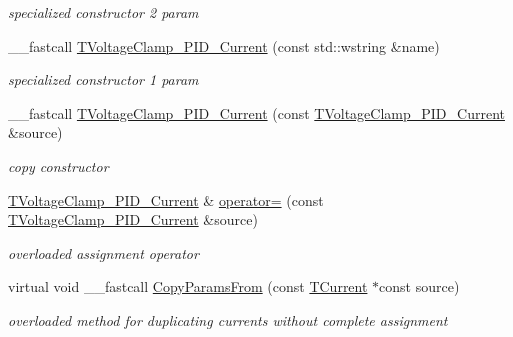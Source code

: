 \begin{DoxyCompactItemize}
\begin{DoxyCompactList}\small\item\em specialized constructor 2 param \end{DoxyCompactList}\item 
\hypertarget{class_t_voltage_clamp___p_i_d___current_a25b4322894753f9ca41a5fd465ece8e1}{\+\_\+\+\_\+fastcall \hyperlink{class_t_voltage_clamp___p_i_d___current_a25b4322894753f9ca41a5fd465ece8e1}{T\+Voltage\+Clamp\+\_\+\+P\+I\+D\+\_\+\+Current} (const std\+::wstring \&name)}\label{class_t_voltage_clamp___p_i_d___current_a25b4322894753f9ca41a5fd465ece8e1}

\begin{DoxyCompactList}\small\item\em specialized constructor 1 param \end{DoxyCompactList}\item 
\hypertarget{class_t_voltage_clamp___p_i_d___current_a4cac8df237b266af70182298b25ce50e}{\+\_\+\+\_\+fastcall \hyperlink{class_t_voltage_clamp___p_i_d___current_a4cac8df237b266af70182298b25ce50e}{T\+Voltage\+Clamp\+\_\+\+P\+I\+D\+\_\+\+Current} (const \hyperlink{class_t_voltage_clamp___p_i_d___current}{T\+Voltage\+Clamp\+\_\+\+P\+I\+D\+\_\+\+Current} \&source)}\label{class_t_voltage_clamp___p_i_d___current_a4cac8df237b266af70182298b25ce50e}

\begin{DoxyCompactList}\small\item\em copy constructor \end{DoxyCompactList}\item 
\hypertarget{class_t_voltage_clamp___p_i_d___current_a0939de636e6a794ab6e3ed1488011151}{\hyperlink{class_t_voltage_clamp___p_i_d___current}{T\+Voltage\+Clamp\+\_\+\+P\+I\+D\+\_\+\+Current} \& \hyperlink{class_t_voltage_clamp___p_i_d___current_a0939de636e6a794ab6e3ed1488011151}{operator=} (const \hyperlink{class_t_voltage_clamp___p_i_d___current}{T\+Voltage\+Clamp\+\_\+\+P\+I\+D\+\_\+\+Current} \&source)}\label{class_t_voltage_clamp___p_i_d___current_a0939de636e6a794ab6e3ed1488011151}

\begin{DoxyCompactList}\small\item\em overloaded assignment operator \end{DoxyCompactList}\item 
\hypertarget{class_t_voltage_clamp___p_i_d___current_ad58bd13fd1a388cd9091644ec47d907e}{virtual void \+\_\+\+\_\+fastcall \hyperlink{class_t_voltage_clamp___p_i_d___current_ad58bd13fd1a388cd9091644ec47d907e}{Copy\+Params\+From} (const \hyperlink{class_t_current}{T\+Current} $\ast$const source)}\label{class_t_voltage_clamp___p_i_d___current_ad58bd13fd1a388cd9091644ec47d907e}

\begin{DoxyCompactList}\small\item\em overloaded method for duplicating currents without complete assignment \end{DoxyCompactList}\end{DoxyCompactItemize}
